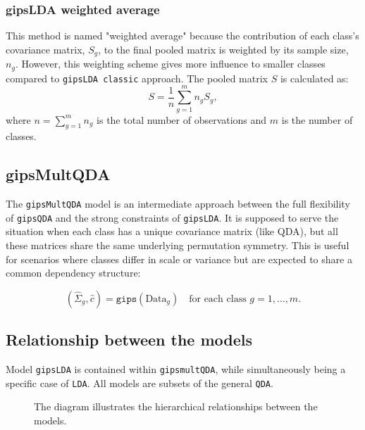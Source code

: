 \documentclass[a4paper,11pt,twoside]{report}
\theoremstyle{definition}
\begin{document}
\subsubsection{gipsLDA weighted average}
This method is named "weighted average" because the contribution of each class's covariance matrix, $S_g$, to the final pooled matrix is weighted by its sample size, $n_g$. However, this weighting scheme gives more influence to smaller classes compared to \texttt{gipsLDA classic} approach. The pooled matrix $S$ is calculated as:
\begin{equation}
    S = \frac{1}{n}\sum_{g=1}^m n_g S_{g},
\end{equation}
where $n = \sum_{g=1}^m n_g$ is the total number of observations and $m$ is the number of classes.


\subsection{gipsMultQDA}
The \texttt{gipsMultQDA} model is an intermediate approach between the full flexibility of \texttt{gipsQDA} and the strong constraints of \texttt{gipsLDA}.
It is supposed to serve the situation when each class has a unique covariance matrix (like QDA), but all these
matrices share the same underlying permutation symmetry. This is useful for scenarios where classes  differ
in scale or variance but are expected to share a common dependency structure:

\begin{equation}
    (\hat{\Sigma}_g, \hat{c}) = \texttt{gips}(\text{Data}_g) \quad \text{for each class } g=1, \dots, m.
\end{equation}

\subsection{Relationship between the models}
Model \texttt{gipsLDA} is contained within \texttt{gipsmultQDA}, while simultaneously being a specific case of \texttt{LDA}. All models are subsets of the general \texttt{QDA}.

\begin{figure}[ht]
\centering
{}
\caption{The diagram illustrates the hierarchical relationships between the models.}
\label{fig:nested-sets}
\end{figure}
\end{document}
